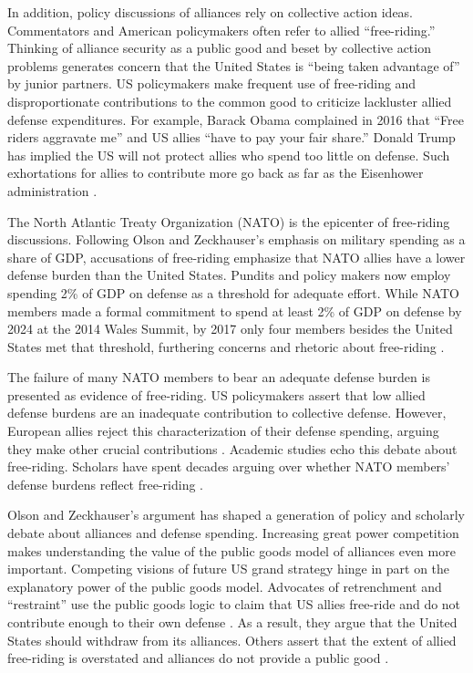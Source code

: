 \documentclass[12pt]{article}
\begin{document}
In addition, policy discussions of alliances rely on collective action ideas.
Commentators and American policymakers often refer to allied ``free-riding.'' 
Thinking of alliance security as a public good and beset by collective action problems generates concern that the United States is ``being taken advantage of'' by junior partners. 
US policymakers make frequent use of free-riding and disproportionate contributions to the common good to criticize lackluster allied defense expenditures.  
For example, Barack Obama complained in 2016 that ``Free riders aggravate me'' and US allies ``have to pay your fair share.'' 
Donald Trump has implied the US will not protect allies who spend too little on defense. 
Such exhortations for allies to contribute more go back as far as the Eisenhower administration \citep{Lanoszka2015}.


The North Atlantic Treaty Organization (NATO) is the epicenter of free-riding discussions. 
Following Olson and Zeckhauser's emphasis on military spending as a share of GDP, accusations of free-riding emphasize that NATO allies have a lower defense burden than the United States. 
Pundits and policy makers now employ spending 2\% of GDP on defense as a threshold for adequate effort.
While NATO members made a formal commitment to spend at least 2\% of GDP on defense by 2024 at the 2014 Wales Summit, by 2017 only four members besides the United States met that threshold, furthering concerns and rhetoric about free-riding \citep{EconomistNATO2017}. 


The failure of many NATO members to bear an adequate defense burden is presented as evidence of free-riding. 
US policymakers assert that low allied defense burdens are an inadequate contribution to collective defense. 
However, European allies reject this characterization of their defense spending, arguing they make other crucial contributions \citep{Boyer1993}. 
Academic studies echo this debate about free-riding.  
Scholars have spent decades arguing over whether NATO members' defense burdens reflect free-riding \citep{SandlerForbes1980, Palmer1990, GatesTerasawa1992, SandlerHartley2001, Lanoszka2015, PluemperNeumayer2015}.


Olson and Zeckhauser's argument has shaped a generation of policy and scholarly debate about alliances and defense spending. 
Increasing great power competition makes understanding the value of the public goods model of alliances even more important. 
Competing visions of future US grand strategy hinge in part on the explanatory power of the public goods model. 
Advocates of retrenchment and ``restraint'' use the public goods logic to claim that US allies free-ride and do not contribute enough to their own defense \citep{Preble2009, Posen2014}. 
As a result, they argue that the United States should withdraw from its alliances.
Others assert that the extent of allied free-riding is overstated and alliances do not provide a public good \citep{Brooksetal2013, BrandsFeaver2017}. 
\end{document}
